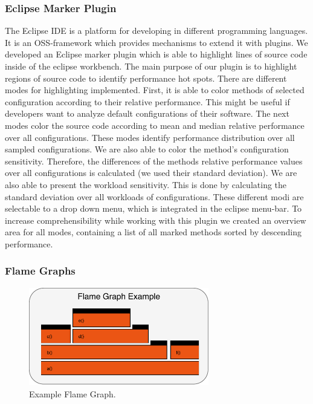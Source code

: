 
\subsubsection{Eclipse Marker Plugin}

The Eclipse IDE is a platform for developing in different programming languages. It is an \ac{OSS}-framework which provides mechanisms to extend it with plugins. We developed an Eclipse marker plugin which is able to highlight lines of source code inside of the eclipse workbench. The main purpose of our plugin is to highlight regions of source code to identify performance hot spots. There are different modes for highlighting implemented. First, it is able to color methods of selected configuration according to their relative performance. This might be useful if developers want to analyze default configurations of their software. The next modes color the source code according to mean and median relative performance over all configurations. These modes identify performance distribution over all sampled configurations. We are also able to color the method's configuration sensitivity. Therefore, the differences of the methods relative performance values over all configurations is calculated (we used their standard deviation). We are also able to present the workload sensitivity. This is done by calculating the standard deviation over all workloads of configurations. These different modi are selectable to a drop down menu, which is integrated in the eclipse menu-bar. To increase comprehensibility while working with this plugin we created an overview area for all modes, containing a list of all marked methods sorted by descending performance. 



\subsubsection{Flame Graphs}

\begin{figure}
  \centering
  \includegraphics[width=0.7\textwidth]{images/Exampleflamegraph}
  \caption{Example Flame Graph.}
  \label{ex_flame_graph}
\end{figure}


